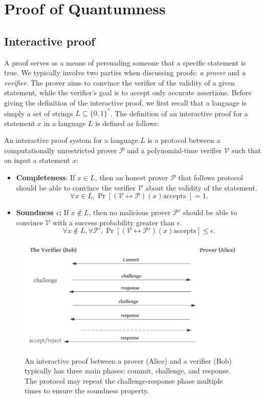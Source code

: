 \section{Proof of Quantumness} \label{proof_of_quantumness}

\subsection{Interactive proof}
A proof serves as a means of persuading someone that a specific statement is true. We typically involve two parties when discussing proofs: \textit{a prover} and \textit{a verifier}. The prover aims to convince the verifier of the validity of a given statement, while the verifier's goal is to accept only accurate assertions. Before giving the definition of the interactive proof, we first recall that a language is simply a set of strings $L\subseteq \{0,1\}^*$. The definition of an interactive proof for a statement $x$ in a language $L$ is defined as follows:

\begin{defn}
    An interactive proof system for a language $L$ is a protocol between a computationally unrestricted prover $\mathcal{P}$ and a polynomial-time verifier $\mathcal{V}$ such that on input a statement $x$:
    \begin{itemize}
        \item \textbf{Completeness}: If $x\in L$, then an honest prover $\mathcal{P}$ that follows protocol should be able to convince the verifier $\mathcal{V}$ about the validity of the statement. 
        $$\forall x\in L, \Pr[(\mathcal{V}\leftrightarrow \mathcal{P})(x) \text{accepts }]=1.$$
        \item \textbf{Soundness $\epsilon$:} If $x \notin L$, then no malicious prover $\mathcal{P}'$ should be able to convince $\mathcal{V}$  with a success probability greater than $\epsilon$.
        $$\forall x\notin L, \forall \mathcal{P}', \Pr[(\mathcal{V}\leftrightarrow \mathcal{P}')(x) \text{accepts}]\leq \epsilon.$$
    \end{itemize}
\end{defn}
\begin{figure}[!htb]
	\centering
	\includegraphics[scale = 0.35]{figures/IP.pdf}
	\caption{An interactive proof between a prover (Alice) and a verifier (Bob) typically has three main phases: commit, challenge, and response. The protocol may repeat the challenge-response phase multiple times to ensure the soundness property.}\label{fig:ip}
\end{figure}

